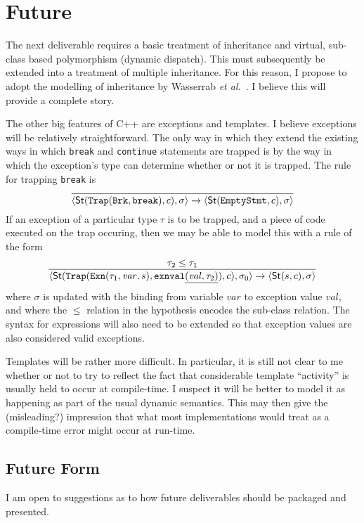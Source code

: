 \documentclass[11pt]{article}
\newcommand{\cpp}{\mbox{C\hspace{-0.5pt}+\hspace{-1.5pt}+}}
\begin{document}
\section{Future}

The next deliverable requires a basic treatment of inheritance and
virtual, sub-class based polymorphism (dynamic dispatch).  This must
subsequently be extended into a treatment of multiple inheritance.
For this reason, I propose to adopt the modelling of inheritance by
Wasserrab \emph{et al.}~\cite{wasserrab-nst-OOPSLA06}.  I believe this
will provide a complete story.

The other big features of \cpp{} are exceptions and templates.  I
believe exceptions will be relatively straightforward.  The only way
in which they extend the existing ways in which \texttt{break} and
\texttt{continue} statements are trapped is by the way in which the
exception's type can determine whether or not it is trapped.  The rule
for trapping \texttt{break} is
\[
\infer{\langle \textsf{St}(\texttt{Trap}(\texttt{Brk},\texttt{break}),
  c), \sigma\rangle\rightarrow
\langle \textsf{St}(\texttt{EmptyStmt}, c), \sigma\rangle}{}
\]
If an exception of a particular type $\tau$ is to be trapped, and a
piece of code executed on the trap occuring, then we may be able to
model this with a rule of the form
\[
\infer{\langle\textsf{St}(\texttt{Trap}(\texttt{Exn}(\tau_1,\mathit{var},s),\texttt{exnval}\underline{(\mathit{val},\tau_2)}),
  c), \sigma_0\rangle \rightarrow
  \langle\textsf{St}(s,c),\sigma\rangle}{\tau_2 \leq \tau_1}
\]
where $\sigma$ is updated with the binding from variable
$\mathit{var}$ to exception value $\mathit{val}$, and where the $\leq$
relation in the hypothesis encodes the sub-class relation.  The
syntax for expressions will also need to be extended so that exception
values are also considered valid exceptions.


Templates will be rather more difficult.  In particular, it is still
not clear to me whether or not to try to reflect the fact that
considerable template ``activity'' is usually held to occur at
compile-time.  I suspect it will be better to model it as happening as
part of the usual dynamic semantics.  This may then give the
(misleading?) impression that what most implementations would treat as
a compile-time error might occur at run-time.

\subsection{Future Form}
I am open to suggestions as to how future deliverables should be
packaged and presented.



\end{document}
